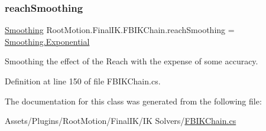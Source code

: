 \subsubsection{\texorpdfstring{reach\+Smoothing}{reachSmoothing}}
{\footnotesize\ttfamily \mbox{\hyperlink{class_root_motion_1_1_final_i_k_1_1_f_b_i_k_chain_a2c75de88180a5922368eaa4c4efb3ac9}{Smoothing}} Root\+Motion.\+Final\+I\+K.\+F\+B\+I\+K\+Chain.\+reach\+Smoothing = \mbox{\hyperlink{class_root_motion_1_1_final_i_k_1_1_f_b_i_k_chain_a2c75de88180a5922368eaa4c4efb3ac9ac1e19c09f700938f0ff7f1fd4722a3ac}{Smoothing.\+Exponential}}}



Smoothing the effect of the Reach with the expense of some accuracy. 



Definition at line 150 of file F\+B\+I\+K\+Chain.\+cs.



The documentation for this class was generated from the following file\+:\begin{DoxyCompactItemize}
\item 
Assets/\+Plugins/\+Root\+Motion/\+Final\+I\+K/\+I\+K Solvers/\mbox{\hyperlink{_f_b_i_k_chain_8cs}{F\+B\+I\+K\+Chain.\+cs}}\end{DoxyCompactItemize}
